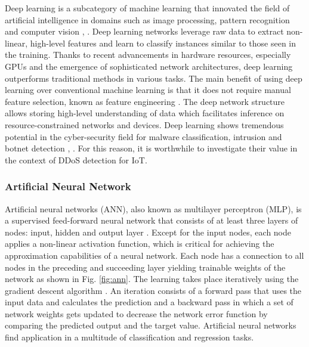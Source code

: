 \documentclass[conference, 11pt]{IEEEtran}
\begin{document}
    Deep learning is a subcategory of machine learning that innovated the field of artificial intelligence in domains such as image processing, pattern recognition and computer vision \cite{article:17}, \cite{Goodfellow-et-al-2016}.
    Deep learning networks leverage raw data to extract non-linear, high-level features and learn to classify instances similar to those seen in the training.
    Thanks to recent advancements in hardware resources, especially GPUs and the emergence of sophisticated network architectures, deep learning outperforms traditional methods in various tasks.
    The main benefit of using deep learning over conventional machine learning is that it does not require manual feature selection, known as feature engineering \cite{Goodfellow-et-al-2016}.
    The deep network structure allows storing high-level understanding of data which facilitates inference on resource-constrained networks and devices.
    Deep learning shows tremendous potential in the cyber-security field for malware classification, intrusion and botnet detection \cite{article:17}, \cite{inproceedings:19}.
    For this reason, it is worthwhile to investigate their value in the context of DDoS detection for IoT.

    \subsubsection{Artificial Neural Network}
    Artificial neural networks (ANN), also known as multilayer perceptron (MLP), is a supervised feed-forward neural network that consists of at least three layers of nodes: input, hidden and output layer  \cite{Goodfellow-et-al-2016}.
    Except for the input nodes, each node applies a non-linear activation function, which is critical for achieving the approximation capabilities of a neural network.
    Each node has a connection to all nodes in the preceding and succeeding layer yielding trainable weights of the network as shown in Fig. \ref{fig:ann}.
    The learning takes place iteratively using the gradient descent algorithm \cite{AMARI1993185}.
    An iteration consists of a forward pass that uses the input data and calculates the prediction and a backward pass in which a set of network weights gets updated to decrease the network error function by comparing the predicted output and the target value.
    Artificial neural networks find application in a multitude of classification and regression tasks.
\end{document}
